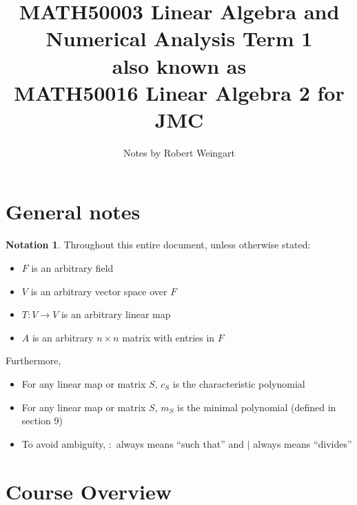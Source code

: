 \documentclass[12pt]{article}
\title{MATH50003 Linear Algebra and Numerical Analysis Term 1\\{\Large also known as}\\MATH50016 Linear Algebra 2 for JMC}
\author{Notes by Robert Weingart}
\date{}
\theoremstyle{definition}
\newtheorem*{not*}{Notation}
\begin{document}
\maketitle

\tableofcontents

\section*{General notes}

%
%

\begin{not*}
	Throughout this entire document, unless otherwise stated:
	\begin{itemize}
		\item $F$ is an arbitrary field
		\item $V$ is an arbitrary vector space over $F$
		\item $T : V \to V$ is an arbitrary linear map
		\item $A$ is an arbitrary $n \times n$ matrix with entries in $F$
	\end{itemize}
	Furthermore,
	\begin{itemize}
		\item For any linear map or matrix $S$, $c_S$ is the characteristic polynomial
		\item For any linear map or matrix $S$, $m_S$ is the minimal polynomial (defined in section 9)
		\item To avoid ambiguity, $:$ always means ``such that'' and $\mid$ always means ``divides''
	\end{itemize}
\end{not*}

\section{Course Overview}
\end{document}
